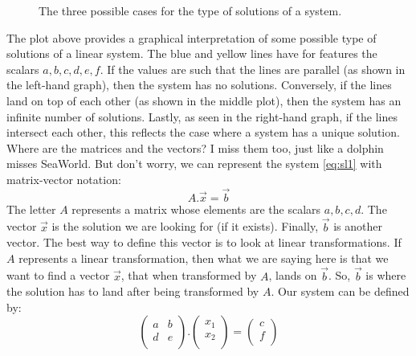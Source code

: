 \documentclass[600paper, 11pt,twoside,openany]{kdp}
\begin{document}
\begin{figure}[h!]
\begin{center}
\end{center}
\vspace*{2pt}
\caption{The three possible cases for the type of solutions of a system.}
\end{figure}
\par 
\vspace{-3pt}
\indent The plot above provides a graphical interpretation of some possible type of solutions of a linear system. The blue and yellow lines have for features the scalars $a,b,c,d,e,f$. If the values are such that the lines are parallel (as shown in the left-hand graph), then the system has no solutions. Conversely, if the lines land on top of each other (as shown in the middle plot), then the system has an infinite number of solutions. Lastly, as seen in the right-hand graph, if the lines intersect each other, this reflects the case where a system has a unique solution. Where are the matrices and the vectors? I miss them too, just like a dolphin misses SeaWorld. But don’t worry, we  can represent the system \ref{eq:sl1} with matrix-vector notation:
\[A.\overrightarrow{x}  = \overrightarrow{b} \]
\indent The letter $A$ represents a matrix whose elements are the scalars $a,b,c,d$. The vector $\overrightarrow{x}$ is the solution we are looking for (if it exists). Finally, $\overrightarrow{b}$ is another vector. The best way to define this vector is to look at linear transformations. If $A$ represents a linear transformation, then what we are saying here is that we want to find a vector $\overrightarrow{x}$, that when transformed by $A$, lands on $\overrightarrow{b}$. So, $\overrightarrow{b}$ is where the solution has to land after being transformed by $A$. Our system can be defined by:
\[ \begin{pmatrix}
a & b \\
d & e\\
\end{pmatrix}. \begin{pmatrix}
x_1\\
x_2\\
\end{pmatrix} = \begin{pmatrix}
c\\
f\\
\end{pmatrix} \]
\end{document}
